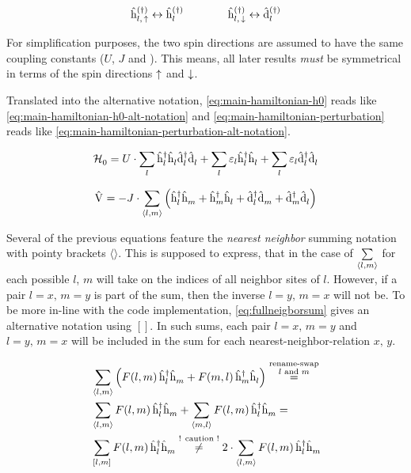 \begin{equation}
    \label{eq:alt-naming-scheme}
    \withspinhcop{l}{\up}{(\dagger)} \leftrightarrow \hop{l}{(\dagger)}
    \qquad\qquad
    \withspinhcop{l}{\down}{(\dagger)} \leftrightarrow \dop{l}{(\dagger)}
\end{equation}

For simplification purposes, the two spin directions are assumed to have the same coupling constants ($U$, $J$ and \epsl).
This means, all later results \emph{must} be symmetrical in terms of the spin directions $\up$ and $\down$.


Translated into the alternative notation, \autoref{eq:main-hamiltonian-h0} reads like \autoref{eq:main-hamiltonian-h0-alt-notation} and \autoref{eq:main-hamiltonian-perturbation} reads like \autoref{eq:main-hamiltonian-perturbation-alt-notation}.

\begin{equation}
    \label{eq:main-hamiltonian-h0-alt-notation}
    \HzeroHamiltonian = U \cdot \lsum \hop[]{l}{\dagger}\hop[]{l}{} \dop[]{l}{\dagger}\dop[]{l}{} + \lsum\epsl \hop[]{l}{\dagger}\hop[]{l}{} + \lsum\epsl \dop[]{l}{\dagger}\dop[]{l}{}
\end{equation}

\begin{equation}
    \label{eq:main-hamiltonian-perturbation-alt-notation}
    \Vhamiltonian =  - J \cdot \neighborsum{l}{m} \left(\hop[]{l}{\dagger}\hop[]{m}{} +\hop[]{m}{\dagger}\hop[]{l}{} + \dop[]{l}{\dagger}\dop[]{m}{} +\dop[]{m}{\dagger}\dop[]{l}{} \right)
\end{equation}

Several of the previous equations feature the \emph{nearest neighbor} summing notation with pointy brackets $\langle\rangle$.
This is supposed to express, that in the case of $\neighborsum[]{l}{m}$ for each possible $l$, $m$ will take on the indices of all neighbor sites of $l$.
However, if a pair $l=x,\,m=y$ is part of the sum, then the inverse $l=y,\,m=x$ will not be.
To be more in-line with the code implementation, \autoref{eq:fullneigborsum} gives an alternative notation using $[]$.
In such sums, each pair $l=x,\,m=y$ and $l=y,\,m=x$ will be included in the sum for each nearest-neighbor-relation $x,\,y$.

\begin{equation}
    \label{eq:fullneigborsum}
    \begin{split}
        &\neighborsum[]{l}{m} \left( F(l,m)\, \hop[]{l}{\dagger}\hop[]{m}{} + F(m,l)\, \hop[]{m}{\dagger}\hop[]{l}{} \right) \stackrel{\stackrel{\text{\scriptsize rename-swap}}{\text{$l$ and $m$}}}{=} \\
        &\neighborsum[]{l}{m} F(l,m)\, \hop[]{l}{\dagger}\hop[]{m}{} + \neighborsum[]{m}{l} F(l,m)\, \hop[]{l}{\dagger}\hop[]{m}{} = \\
        &\fullneighborsum[]{l}{m} F(l,m)\, \hop[]{l}{\dagger}\hop[]{m}{} \stackrel{\text{! caution !}}{\neq}
        2 \cdot \neighborsum[]{l}{m} F(l,m)\, \hop[]{l}{\dagger}\hop[]{m}{}
    \end{split}
\end{equation}


